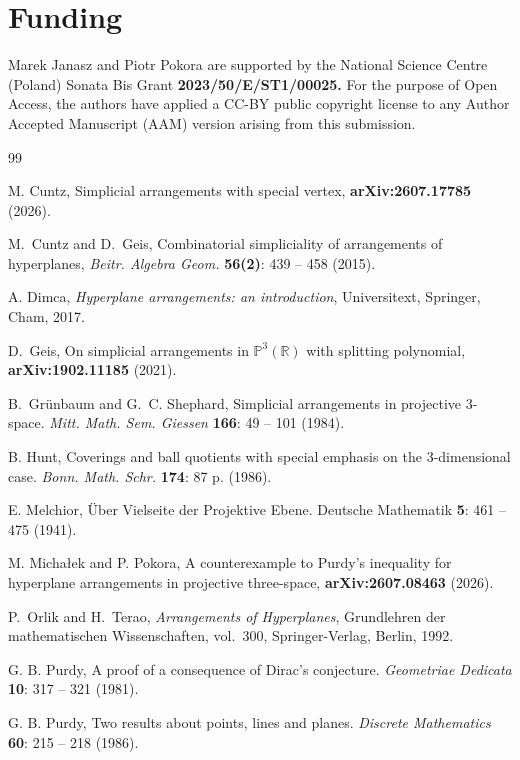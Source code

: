 \documentclass[11pt]{article}
\theoremstyle{definition}
\theoremstyle{remark}
\newcommand{\PP}{\mathbb P}
\newcommand{\RR}{\mathbb R}
\begin{document}
\section*{Funding}
Marek Janasz and Piotr Pokora are supported by the National Science Centre (Poland) Sonata Bis Grant  \textbf{2023/50/E/ST1/00025.} For the purpose of Open Access, the authors have applied a CC-BY public copyright license to any Author Accepted Manuscript (AAM) version arising from this submission.
\begin{thebibliography}{99}

M. Cuntz, Simplicial arrangements with special vertex, \textbf{arXiv:2607.17785} (2026).

M.~Cuntz and D.~Geis,
\newblock Combinatorial simpliciality of arrangements of hyperplanes,
\newblock \emph{Beitr. Algebra Geom.} \textbf{56(2)}: 439 -- 458 (2015).


A. Dimca,
\emph{Hyperplane arrangements: an introduction},
Universitext, Springer, Cham, 2017.

D.~Geis, On simplicial arrangements in $\PP^3(\RR)$ with splitting
polynomial, \textbf{arXiv:1902.11185} (2021).

B.~Gr\"unbaum and G.~C. Shephard, Simplicial arrangements in projective $3$-space. \emph{Mitt. Math. Sem. Giessen} \textbf{166}: 49 -- 101 (1984).

B. Hunt, Coverings and ball quotients with special emphasis on the 3-dimensional case. \textit{Bonn. Math. Schr.} \textbf{174}: 87 p. (1986).

E. Melchior, \"{U}ber Vielseite der Projektive Ebene. Deutsche Mathematik {\bf 5}: 461 -- 475 (1941).

M. Micha{\l}ek and P. Pokora, A counterexample to Purdy's inequality for hyperplane arrangements in projective three-space, \textbf{arXiv:2607.08463} (2026).


P.~Orlik and H.~Terao,
\newblock \emph{Arrangements of Hyperplanes},
\newblock Grundlehren der mathematischen Wissenschaften, vol.~300,
Springer-Verlag, Berlin, 1992.

G. B. Purdy, A proof of a consequence of Dirac’s conjecture. 
\textit{Geometriae Dedicata} \textbf{10}: 317 -- 321 (1981).

G. B. Purdy, Two results about points, lines and planes.
\textit{Discrete Mathematics} \textbf{60}: 215 -- 218 (1986).


\end{thebibliography}
\end{document}
